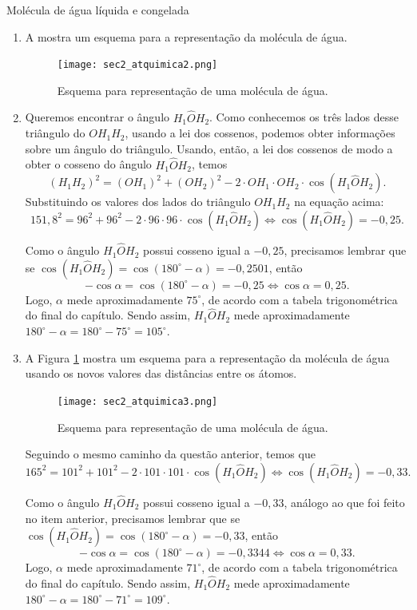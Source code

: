 \begin{answer}{Molécula de água líquida e congelada}
{
\begin{enumerate}
    \item{} A  mostra um esquema  para a representação da molécula de água. 
    \begin{figure}[H]
        \centering
        \texttt{[image: sec2\_atquimica2.png]}
        \caption{Esquema para representação de uma molécula de água.}
        \label{sec2_resatquimica2}
    \end{figure}
     
    \item{}
    Queremos encontrar o ângulo $H_1\hat{O}H_2$. Como conhecemos os três lados desse triângulo do $OH_1H_2$, usando a lei dos cossenos, podemos obter informações sobre um ângulo do triângulo. Usando, então, a lei dos cossenos de modo a obter o cosseno do ângulo $H_1\hat{O}H_2$, temos
    $$(H_1H_2)^2=(OH_1)^2+(OH_2)^2-2\cdot OH_1\cdot OH_2\cdot\cos({H_1\hat{O}H_2}).$$
    Substituindo os valores dos lados do triângulo $OH_1H_2$ na equação acima:
    $$151,8^2=96^2+96^2-2\cdot 96\cdot 96\cdot\cos({H_1\hat{O}H_2}) \iff \cos({H_1\hat{O}H_2})=-0,25.$$
    
    Como o ângulo ${H_1\hat{O}H_2}$ possui cosseno igual a $-0,25$, precisamos lembrar que se $\cos(H_1\hat{O}H_2)=\cos(180^\circ-\alpha)=-0,2501$, então 
    $$-\cos\alpha=\cos(180^\circ-\alpha)=-0,25 \iff \cos\alpha=0,25.$$
    Logo, $\alpha$ mede aproximadamente $75^\circ$, de acordo com a tabela trigonométrica do final do capítulo. Sendo assim, $H_1\hat{O}H_2$ mede aproximadamente $180^\circ-\alpha=180^\circ-75^\circ=105^\circ.$
    
    \item{}
    A Figura \ref{sec2_resatquimica2} mostra um esquema  para a representação da molécula de água usando os novos valores das distâncias entre os átomos.
    \begin{figure}[H]
        \centering
        \texttt{[image: sec2\_atquimica3.png]}
        \caption{Esquema para representação de uma molécula de água.}
        \label{sec2_resatquimica3}
    \end{figure}
    Seguindo o mesmo caminho da questão anterior, temos que
    $$165^2=101^2+101^2-2\cdot 101\cdot 101\cdot\cos({H_1\hat{O}H_2}) \iff \cos({H_1\hat{O}H_2})=-0,33.$$
    
    Como o ângulo ${H_1\hat{O}H_2}$ possui cosseno igual a $-0,33$, análogo ao que foi feito no item anterior, precisamos lembrar que se $\cos(H_1\hat{O}H_2)=\cos(180^\circ-\alpha)=-0,33$, então 
    $$-\cos\alpha=\cos(180^\circ-\alpha)=-0,3344 \iff \cos\alpha=0,33.$$
    Logo, $\alpha$ mede aproximadamente $71^\circ$, de acordo com a tabela trigonométrica do final do capítulo. Sendo assim, $H_1\hat{O}H_2$ mede aproximadamente $180^\circ-\alpha=180^\circ-71^\circ=109^\circ.$
    

\end{enumerate}}
\end{answer}
